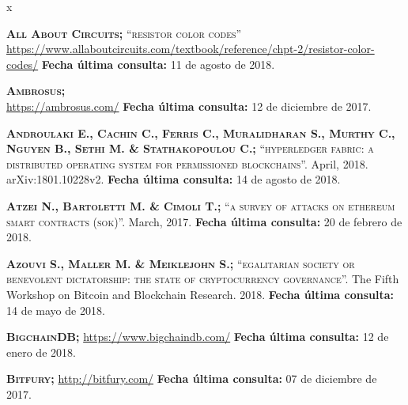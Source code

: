 
\begin{thebibliography} {x}
	
	\pagestyle{empty}
	\thispagestyle{empty}

	\begingroup %
	\raggedright 
	\sloppy
	
	 \textsc{\textbf{All About Circuits; }}\textsc{“resistor color codes”} \\ 
	\url{https://www.allaboutcircuits.com/textbook/reference/chpt-2/resistor-color-codes/}
	\newline \textbf{Fecha última consulta:} 11 de agosto de 2018.
						
	 \textsc{\textbf{Ambrosus; }} \\
	\url{https://ambrosus.com/}
	\newline \textbf{Fecha última consulta:} 12 de diciembre de 2017.
	
	 \textsc{\textbf{Androulaki E., Cachin C., Ferris C., Muralidharan S., Murthy C., Nguyen B., Sethi M. \& Stathakopoulou C.; }}\textsc{“hyperledger fabric: a distributed operating system for permissioned blockchains”.} April, 2018. arXiv:1801.10228v2.
	\newline \textbf{Fecha última consulta:} 14 de agosto de 2018.
		
	 \textsc{\textbf{Atzei N., Bartoletti M. \& Cimoli T.; }}\textsc{“a survey of attacks on ethereum smart contracts (sok)”.} March, 2017.
	\newline \textbf{Fecha última consulta:} 20 de febrero de 2018.
	
	 \textsc{\textbf{Azouvi S., Maller M. \& Meiklejohn S.; }}\textsc{“egalitarian society or benevolent dictatorship: the state of cryptocurrency governance”.} The Fifth Workshop on Bitcoin and Blockchain Research. 2018.
	\newline \textbf{Fecha última consulta:} 14 de mayo de 2018.
			
	 \textsc{\textbf{BigchainDB; }} 
	\url{https://www.bigchaindb.com/}
	\newline \textbf{Fecha última consulta:} 12 de enero de 2018.
			
	 \textsc{\textbf{Bitfury; }} 
	\url{http://bitfury.com/}
	\newline \textbf{Fecha última consulta:} 07 de diciembre de 2017.
			

\end{thebibliography}
